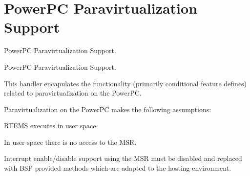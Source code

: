 \hypertarget{group__RTEMSScoreCPUPowerPCParavirt}{}\section{Power\+PC Paravirtualization Support}
\label{group__RTEMSScoreCPUPowerPCParavirt}


Power\+PC Paravirtualization Support.  


Power\+PC Paravirtualization Support. 

This handler encapulates the functionality (primarily conditional feature defines) related to paravirtualization on the Power\+PC.

Paravirtualization on the Power\+PC makes the following assumptions\+:


\begin{DoxyItemize}
\item R\+T\+E\+MS executes in user space
\item In user space there is no access to the M\+SR.
\item Interrupt enable/disable support using the M\+SR must be disabled and replaced with B\+SP provided methods which are adapted to the hosting environment. 
\end{DoxyItemize}